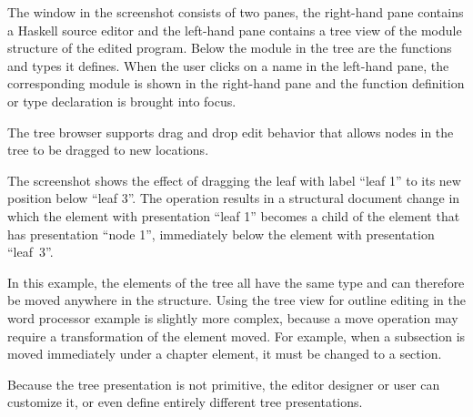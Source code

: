 
The window in the screenshot consists of two panes, the right-hand pane contains a Haskell source editor and the left-hand pane contains a tree view of the module structure of the edited program. Below the module in the tree are the functions and types it defines. When the user clicks on a name in the left-hand pane, the corresponding module is shown in the right-hand pane and the function definition or type declaration is brought into focus. 


The tree browser supports drag and drop edit behavior that allows nodes in the tree to be dragged to new locations. 


The screenshot shows the effect of dragging the leaf with label ``leaf 1'' to its new position below ``leaf 3''. The operation results in a structural document change in which the element with presentation ``leaf 1'' becomes a child of the element that has presentation ``node 1'', immediately below the element with presentation ``leaf~3''.

In this example, the elements of the tree all have the same type and can therefore be moved anywhere in the structure. %
Using the tree view for outline editing in the word processor example is slightly more complex, because a move operation may require a transformation of the element moved. For example, when a subsection is moved immediately under a chapter element, it must be changed to a section. 


Because the tree presentation is not primitive, the editor designer or user can customize it, or even define entirely different tree presentations.


